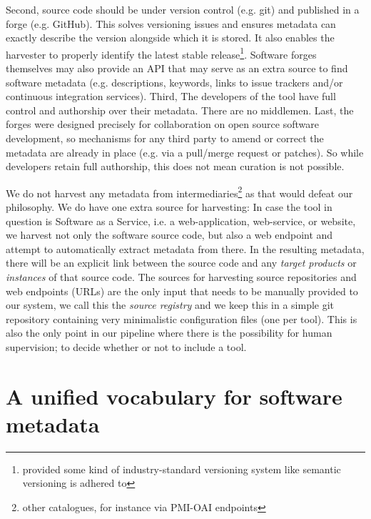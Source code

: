 \documentclass[a4paper,11pt]{article}
\begin{document}
  Second, source code should be under version control (e.g. git) and published in a forge (e.g. GitHub).
  This solves versioning issues and ensures metadata can exactly describe the version alongside which it is stored. It also enables the 
  harvester to properly identify the latest stable release\footnote{provided some kind of industry-standard versioning system like semantic versioning is adhered to}.
  Software forges themselves may also provide an API that may serve as an extra source to find software metadata (e.g. descriptions, keywords, links to issue trackers and/or continuous integration services).
  Third, The developers of the tool have full control and authorship over their metadata. There are no middlemen.
  Last, the forges were designed precisely for collaboration on open source software development, so mechanisms for any
  third party to amend or correct the metadata are already in place (e.g. via a pull/merge request or patches).
  So while developers retain full authorship, this does not mean curation is not possible.

We do not harvest any metadata from intermediaries\footnote{other catalogues, for instance via PMI-OAI
endpoints} as that would defeat our philosophy. We do have one extra source for
harvesting: In case the tool in question is Software as a Service, i.e. a
web-application, web-service, or website, we harvest not only the software
source code, but also a web endpoint and attempt to automatically extract
metadata from there. In the resulting metadata, there will be an explicit link
between the source code and any \emph{target products} or \emph{instances} of
that source code. The sources for harvesting source repositories and web
endpoints (URLs) are the only input that needs to be manually provided to our
system, we call this the \emph{source registry} and we keep this in a simple
git repository containing very minimalistic configuration files (one per tool).
This is also the only point in our pipeline where there is the possibility for
human supervision; to decide whether or not to include a tool.

\section{A unified vocabulary for software metadata}
\end{document}
